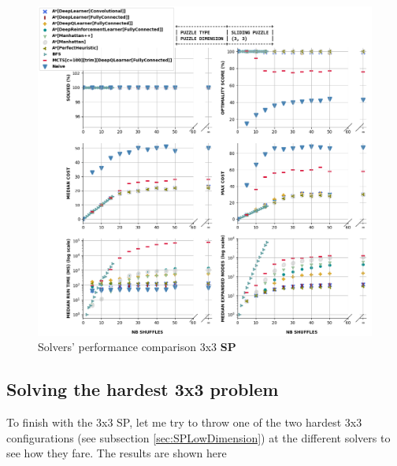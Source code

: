 \begin{figure}[H]
\centering
\includegraphics[scale=0.65]{./Figures/33SPPerformance}
\caption[33SPPerformance]{Solvers' performance comparison 3x3 \textbf{SP}}
\label{fig:33SPPerformance}
\end{figure}


\subsection{Solving the hardest 3x3 problem}
To finish with the 3x3 SP, let me try to throw one of the two hardest 3x3 configurations (see subsection \ref{sec:SPLowDimension}) at the different solvers to see how they fare. The results are shown here

